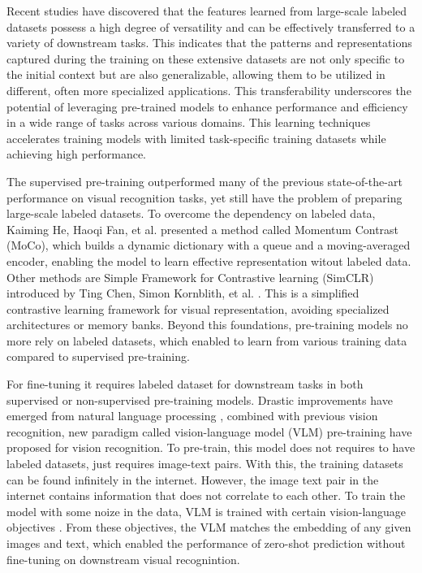 Recent studies \cite{radford2021learning} have discovered that the features learned from large-scale labeled datasets possess a high degree of versatility and can be effectively transferred to a variety of downstream tasks. This indicates that the patterns and representations captured during the training on these extensive datasets are not only specific to the initial context but are also generalizable, allowing them to be utilized in different, often more specialized applications. This transferability underscores the potential of leveraging pre-trained models to enhance performance and efficiency in a wide range of tasks across various domains. 
This learning techniques accelerates training models with limited task-specific training datasets while achieving high performance.

The supervised pre-training outperformed many of the previous state-of-the-art performance on visual recognition tasks, yet still have the problem of preparing large-scale labeled datasets. To overcome the dependency on labeled data, Kaiming He, Haoqi Fan, et al.\cite{he2020momentumcontrastunsupervisedvisual} presented a method called Momentum Contrast (MoCo), which builds a dynamic dictionary with a queue and a moving-averaged encoder, enabling the model to learn effective representation witout labeled data. Other methods are Simple Framework for Contrastive learning (SimCLR) introduced by Ting Chen, Simon Kornblith, et al. \cite{chen2020simpleframeworkcontrastivelearning}. This is a simplified contrastive learning framework for visual representation, avoiding specialized architectures or memory banks. 
Beyond this foundations, pre-training models no more rely on labeled datasets, which enabled to learn from various training data compared to supervised pre-training. 

For fine-tuning it requires labeled dataset for downstream tasks in both supervised or non-supervised pre-training models. Drastic improvements have emerged from natural language processing \cite{devlin2018bert}\cite{brown2020language}, combined with previous vision recognition, new paradigm called vision-language model (VLM) pre-training have proposed for vision recognition. To pre-train, this model does not requires to have labeled datasets, just requires image-text pairs. With this, the training datasets can be found infinitely in the internet. However, the image text pair in the internet contains information that does not correlate to each other. To train the model with some noize in the data, VLM is trained with certain vision-language objectives \cite{radford2021learning} \cite{yu2022cocacontrastivecaptionersimagetext}. From these objectives, the VLM 
matches the embedding of any given images and text, which enabled the performance of zero-shot prediction without fine-tuning on downstream visual recognintion.

